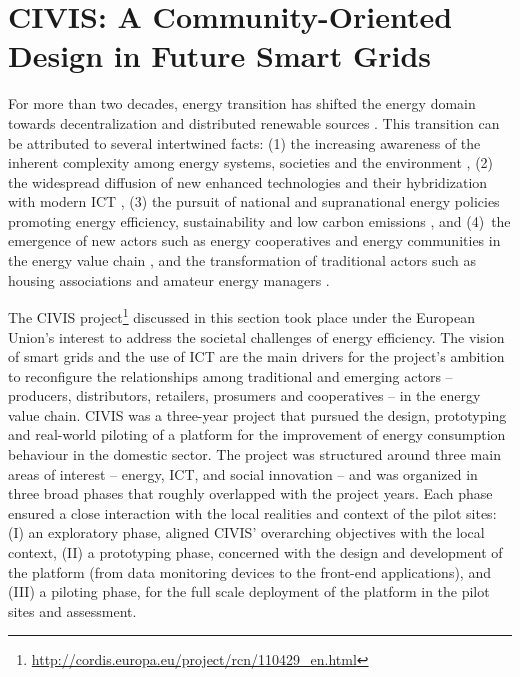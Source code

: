 \section{CIVIS: A Community-Oriented Design in Future Smart Grids}
\label{sec:civis}

For more than two decades, energy transition has shifted the energy domain
towards decentralization and distributed renewable sources \cite{rifkin_third_2011,sovacool_how_2016}. This transition can be attributed to several intertwined facts: 
(1) the increasing awareness of the inherent complexity among energy systems, societies 
and the environment \cite{bulkeley_bringing_2012,umbach_global_2010}, (2) the
widespread diffusion of new enhanced technologies and their hybridization with modern ICT
\cite{putrus_smart_2013,schick_innovating_2013}, (3) the pursuit of national and 
supranational energy policies promoting energy efficiency, sustainability and low carbon emissions 
\cite{da_graca_carvalho_eu_2012}, and (4)~the emergence of new actors such as energy cooperatives and energy communities in the energy value chain \cite{viardot_role_2013}, and the 
transformation of traditional actors such as housing associations and amateur energy managers 
\cite{hasselqvist_linking_2016}.

The CIVIS project\footnote{\url{http://cordis.europa.eu/project/rcn/110429\_en.html}} discussed in this section took place under the European Union's interest to address the societal challenges of energy efficiency. The vision of smart grids and the use of ICT are 
the main drivers for the project's ambition to reconfigure the relationships among traditional and 
emerging actors -- producers, distributors, retailers, 
prosumers and cooperatives -- in the energy value chain. CIVIS was a three-year project that pursued the design, prototyping and real-world piloting of 
a platform for the improvement of energy consumption behaviour in the domestic sector. The project was 
structured around three main areas of interest -- energy, ICT, and social innovation 
-- and was organized in three broad phases that roughly overlapped with the project years.
Each phase ensured a close interaction with the local realities and context of the pilot sites: (I) an 
exploratory phase, aligned CIVIS' overarching objectives with the local context,
(II) a prototyping phase, concerned with the design and development of the platform 
(from data monitoring devices to the front-end applications), and (III) a piloting 
phase, for the full scale deployment of the platform in the pilot sites and 
assessment.

